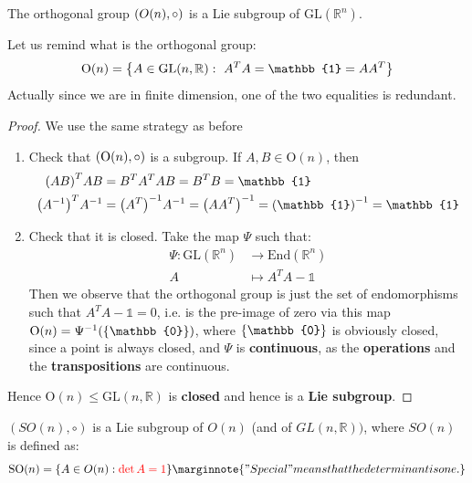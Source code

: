 \documentclass[../main.tex]{subfiles}
\begin{document}
\begin{corollary}
The orthogonal group $\pqty{O(n),\circ}$ is a Lie subgroup of $\textrm{GL}(\mathbb{R}^n)$.
\end{corollary}
Let us remind what is the orthogonal group:
\[
\textrm{O}(n)=\Bqty{A\in\textrm{GL}(n,\mathbb{R}): \ A^TA=\mathbb{1}=AA^T}
\]
Actually since we are in finite dimension, one of the two equalities is redundant.
\begin{proof}
We use the same strategy as before
\begin{enumerate}
    \item Check that $\pqty{\textrm{O}(n),\circ}$ is a subgroup. If $A,B\in\textrm{O}(n)$, then
    \[
    \begin{split}
    \pqty{AB}^TAB&=B^TA^TAB=B^TB=\mathbb{1}\\
    \pqty{A^{-1}}^TA^{-1}&=\pqty{A^T}^{-1}A^{-1}=\pqty{AA^T}^{-1}=\pqty{\mathbb{1}}^{-1}=\mathbb{1}
    \end{split}
    \]
    \item Check that it is closed. Take the map $\Psi$ such that:
    \[
    \begin{split}
        \Psi:\textrm{GL}(\mathbb{R}^n)&\to \textrm{End}(\mathbb{R}^n)\\
        A&\mapsto A^TA-\mathbb{1}
    \end{split}
    \]
    Then we observe that the orthogonal group is just the set of endomorphisms such that $ A^TA-\mathbb{1}=0$, i.e. is the pre-image of zero via this map $\textrm{O}(n)=\Psi^{-1}\pqty{\Bqty{\mathbb{0}}}$, where $\Bqty{\mathbb{0}}$ is obviously closed, since a point is always closed, and  $\Psi$ is \textbf{continuous}, as the \textbf{operations} and the \textbf{transpositions} are continuous. 
\end{enumerate}
Hence $\textrm{O}(n)\leq \textrm{GL}(n,\mathbb{R})$ is \textbf{closed} and hence is a \textbf{Lie subgroup}.
\end{proof}
\begin{corollary}
$(SO(n),\circ)$ is a Lie subgroup of $O(n)$ (and of $GL(n,\mathbb{R}))$, where $SO(n)$ is defined as:
\[
\text{SO}(n)=\{A\in O(n): {\color{red}\det A=1}\}\marginnote{"Special" means that the determinant is one.}
\]
\end{corollary}
\end{document}
